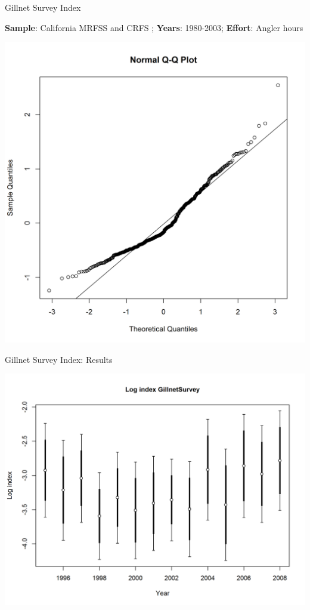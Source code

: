 \documentclass[ignorenonframetext,compress]{beamer}
\begin{document}
\begin{frame}{Gillnet Survey Index}

\textbf{Sample}: California MRFSS and CRFS ; \textbf{Years}: 1980-2003;
\textbf{Effort}: Angler hours

\includegraphics{Figures/Fleet9_GillnetSurvey_QQ.png}

\end{frame}

\begin{frame}{Gillnet Survey Index: Results}

\includegraphics{r4ss/plots_mod1/index4_logcpuedata_GillnetSurvey.png}

\end{frame}
\end{document}
